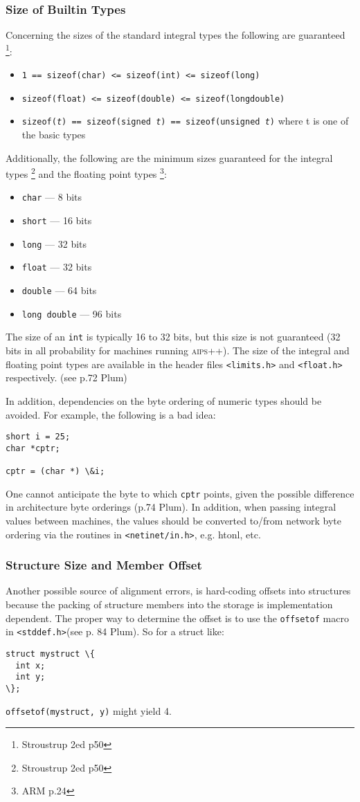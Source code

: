 \subsubsection{Size of Builtin Types}
Concerning the sizes of the standard integral types the following are 
guaranteed \footnote{Stroustrup 2ed p50}:
\begin{itemize}
\item
\texttt{1 == sizeof(char) <= sizeof(int) <= sizeof(long)}
\item
\texttt{sizeof(float) <= sizeof(double) <= sizeof(longdouble)}
\item
\texttt{sizeof(\emph{t}) == sizeof(signed \emph{t}) == sizeof(unsigned \emph{t})} where t is one of the basic types
\end{itemize}
\noindent
Additionally, the following are the minimum sizes guaranteed for the integral
types \footnote{Stroustrup 2ed p50} and the floating point 
types \footnote{ARM p.24}:
\begin{itemize}
\item
\texttt{char} --- 8 bits
\item
\texttt{short} --- 16 bits
\item
\texttt{long} --- 32 bits
\item
\texttt{float} --- 32 bits
\item
\texttt{double} --- 64 bits
\item 
\texttt{long double} --- 96 bits
\end{itemize}
\noindent
The size of an \texttt{int} is typically 16 to 32 bits, but this size is not
guaranteed (32 bits in all probability for machines running \textsc{aips++}). The
size of the integral and floating point types are available in the header
files \texttt{<limits.h>} and \texttt{<float.h>} respectively.
(see p.72 Plum)

In addition, dependencies on the byte ordering of numeric types should be 
avoided. For example, the following is a bad idea:
\begin{verbatim}
short i = 25;
char *cptr;

cptr = (char *) \&i;
\end{verbatim}
\noindent
One cannot anticipate the byte to which \texttt{cptr} points, given the possible
difference in architecture byte orderings (p.74 Plum). In addition, when 
passing integral values between machines, the values should be converted 
to/from network byte ordering via the routines in \texttt{<netinet/in.h>}, 
e.g. htonl, etc.

\subsubsection{Structure Size and Member Offset}
Another possible source of alignment errors, is hard-coding offsets into 
structures because the packing of structure members into the storage
is implementation dependent. The proper way to determine the offset
is to use the \texttt{offsetof} macro in \texttt{<stddef.h>}(see p. 84 Plum).
So for a struct like:
\begin{verbatim}
struct mystruct \{
  int x;
  int y;
\};
\end{verbatim}
\noindent
\texttt{offsetof(mystruct, y)} might yield 4.


